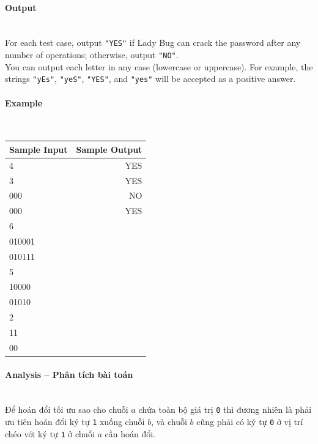 \documentclass{article}
\begin{document}
\paragraph{Output}\mbox{} \\

For each test case, output \texttt{"YES"} if Lady Bug can crack the password after any number of operations; otherwise, output \texttt{"NO"}.\\

You can output each letter in any case (lowercase or uppercase). For example, the strings \texttt{"yEs"}, \texttt{"yeS"}, \texttt{"YES"}, and \texttt{"yes"} will be accepted as a positive answer.

\paragraph{Example}\mbox{} \\

\begin{table}[h]
    \centering
    \begin{tabular}{|l|r|}
        \hline
        \textbf{Sample Input} & \textbf{Sample Output} \\
        \hline
        4 & YES \\
        3 & YES \\
        000 & NO \\
        000 & YES \\
        6 & \\
        010001 & \\
        010111 & \\
        5 & \\
        10000 & \\
        01010 & \\
        2 & \\
        11 & \\
        00 & \\
        \hline
    \end{tabular}
\end{table}

\paragraph{Analysis -- Phân tích bài toán} \mbox{} \\

Để hoán đổi tối ưu sao cho chuỗi $a$ chứa toàn bộ giá trị \texttt{0} thì đương nhiên là phải ưu tiên hoán đổi ký tự \texttt{1} xuống chuỗi $b$, và chuỗi $b$ cũng phải có ký tự \texttt{0} ở vị trí chéo với ký tự \texttt{1} ở chuỗi $a$ cần hoán đổi.\\
\end{document}
